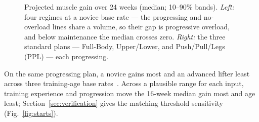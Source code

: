 \documentclass[11pt,a4paper]{article}
\begin{document}
\begin{figure}[!htb]
\begin{minipage}[t]{0.49\linewidth}
\end{minipage}
\caption{Projected muscle gain over 24 weeks (median; 10--90\% bands). \emph{Left:} four regimes at a novice base rate --- the progressing and no-overload lines share a volume, so their gap is progressive overload, and below maintenance the median crosses zero. \emph{Right:} the three standard plans --- Full-Body, Upper/Lower, and Push/Pull/Legs (PPL) --- each progressing.}\label{fig:regimes}
\end{figure}

On the same progressing plan, a novice gains most and an advanced lifter least across three training-age base rates~\cite{damas}. Across a plausible range for each input, training experience and progression move the 16-week median gain most and age least; Section~\ref{sec:verification} gives the matching threshold sensitivity (Fig.~\ref{fig:starts}).
\end{document}
